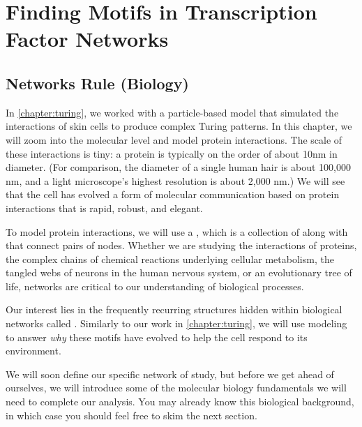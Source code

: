 \chapter[Finding Motifs in Transcription Factor Networks]{Finding Motifs in Transcription Factor Networks}
\label{chapter:motifs}
\renewcommand{\chaptertitle}{Finding Motifs in Transcription Factor Networks}


\FloatBarrier

\section{Networks Rule (Biology)}
\label{sec:introduction}

In \autoref{chapter:turing}, we worked with a particle-based model that simulated the interactions of skin cells to produce complex Turing patterns. In this chapter, we will zoom into the molecular level and model protein interactions. The scale of these interactions is tiny: a protein is typically on the order of about 10nm in diameter. (For comparison, the diameter of a single human hair is about 100,000 nm, and a light microscope's highest resolution is about 2,000 nm.) We will see that the cell has evolved a form of molecular communication based on protein interactions that is rapid, robust, and elegant.

To model protein interactions, we will use a  , which is a collection of  along with  that connect pairs of nodes. Whether we are studying the interactions of proteins, the complex chains of chemical reactions underlying cellular metabolism, the tangled webs of neurons in the human nervous system, or an evolutionary tree of life, networks are critical to our understanding of biological processes.

Our interest lies in the frequently recurring structures hidden within biological networks called . Similarly to our work in \autoref{chapter:turing}, we will use modeling to answer \textit{why} these motifs have evolved to help the cell respond to its environment.

We will soon define our specific network of study, but before we get ahead of ourselves, we will introduce some of the molecular biology fundamentals we will need to complete our analysis. You may already know this biological background, in which case you should feel free to skim the next section.\\

